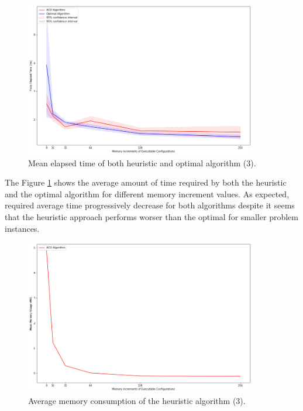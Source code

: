 \documentclass[12pt,a4paper]{report}
\begin{document}
\begin{figure}[h]
	\centering
	\includegraphics[width=0.9\textwidth]{./Images/ACOvsOptimalIncreasingMemoryIncrement.png}
	\caption{Mean elapsed time of both heuristic and optimal algorithm (3).}%
	\label{ACOvsOptimalIncreasingMemoryIncrement}
\end{figure}

The Figure \ref{ACOvsOptimalIncreasingMemoryIncrement} shows the average amount of time required by both the heuristic and the optimal algorithm for different memory increment values. As expected, required average time progressively decrease for both algorithms despite it seems that the heuristic approach performs worser than the optimal for smaller problem instances.

\begin{figure}[h]
	\centering
	\includegraphics[width=0.9\textwidth]{./Images/ACORamConsumptionIncreasingMemoryIncrement.png}
	\caption{Average memory consumption of the heuristic algorithm (3).}%
	\label{ACORamConsumptionIncreasingMemoryIncrement}
\end{figure}
\end{document}
